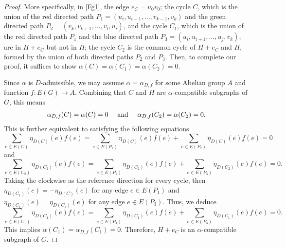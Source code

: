\documentclass[12pt]{article}%
\numberwithin{equation}{section}
\def\And{\mbox{\rm ~and~}}
\begin{document}
\begin{proof}
More specifically, in \autoref{Fg1},  the edge $e_C=u_0v_0$; the cycle $C$, which is the union of the red directed path $P_1=(u_i,u_{i-1},\ldots,v_{k-1},v_k)$ and the green directed path $P_2=(v_k,v_{k+1},\ldots,v_l,u_i)$, and the cycle $C_1$, which is the union of  the red directed path $P_1$ and the blue directed path $P_3=(u_i,u_{i+1},\ldots,u_j,v_k)$, are in $H+e_C$ but not in $H$; the cycle $C_2$ is the common cycle of $H+e_C$ and $H$, formed by the union of both directed paths $P_2$ and $P_3$. Then, to complete our proof, it suffices to show $\alpha(C)=\alpha(C_1)=\alpha(C_2)=0$.

Since $\alpha$ is $D$-admissible, we may assume $\alpha=\alpha_{D,f}$ for some Abelian group $A$ and function $f:E(G)\to A$. Combining that $C$ and $H$ are $\alpha$-compatible subgraphs of $G$, this means 
\[
\alpha_{D,f}(C)=\alpha(C)=0\quad\And\quad\alpha_{D,f}(C_2)=\alpha(C_2)=0.
\]
This is further equivalent to satisfying the following equations
\[
\sum_{e\in E(C)}\eta_{D(C)}(e)f(e)=\sum_{e\in E(P_1)}\eta_{D(C)}(e)f(e)+\sum_{e\in E(P_2)}\eta_{D(C)}(e)f(e)=0
\]
and
\[
\sum_{e\in E(C_2)}\eta_{D(C_2)}(e)f(e)=\sum_{e\in E(P_2)}\eta_{D(C_2)}(e)f(e)+\sum_{e\in E(P_3)}\eta_{D(C_2)}(e)f(e)=0.
\]
Taking the clockwise as the reference direction for every cycle, then $\eta_{D(C_1)}(e)=-\eta_{D(C)}(e)$ for any edge $e\in E(P_1)$ and $\eta_{D(C_1)}(e)=\eta_{D(C_2)}(e)$ for any edge $e\in E(P_3)$. Thus, we deduce
\[
\sum_{e\in E(C_1)}\eta_{D(C_1)}(e)f(e)=\sum_{e\in E(P_1)}\eta_{D(C_1)}(e)f(e)+\sum_{e\in E(P_3)}\eta_{D(C_1)}(e)f(e)=0.
\]
This implies $\alpha(C_1)=\alpha_{D,f}(C_1)=0$. Therefore, $H+e_C$ is an $\alpha$-compatible subgraph of $G$.
\end{proof}
\end{document}
